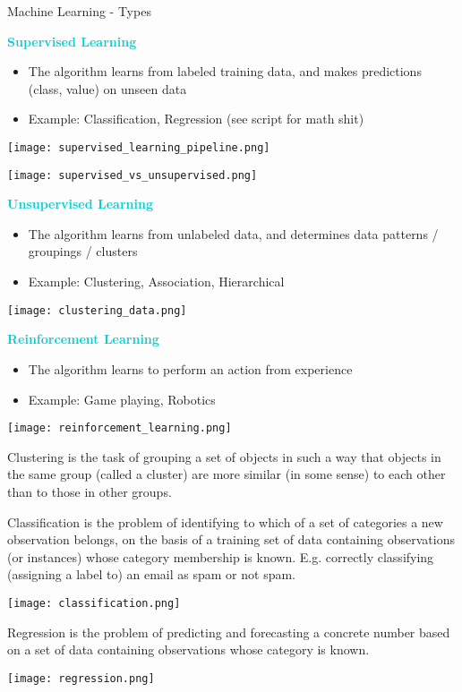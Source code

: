 \begin{concept}{Machine Learning - Types}

    \textcolor{darkturquoise}{\textbf{Supervised Learning}}
    \begin{itemize}
        \item The algorithm learns from labeled training data, and makes predictions (class, value) on unseen data
        \item Example: Classification, Regression (see script for math shit)
    \end{itemize}

    \texttt{[image: supervised\_learning\_pipeline.png]}

    \texttt{[image: supervised\_vs\_unsupervised.png]}

    \textcolor{darkturquoise}{\textbf{Unsupervised Learning}}
    \begin{itemize}
        \item The algorithm learns from unlabeled data, and determines data patterns / groupings / clusters
        \item Example: Clustering, Association, Hierarchical
    \end{itemize}

    \texttt{[image: clustering\_data.png]}

    \textcolor{darkturquoise}{\textbf{Reinforcement Learning}}
    \begin{itemize}
        \item The algorithm learns to perform an action from experience
        \item Example: Game playing, Robotics
    \end{itemize}

    \texttt{[image: reinforcement\_learning.png]}
\end{concept}

\begin{definition}{Clustering}
    is the task of grouping a set of objects in such a way that objects in the same group (called a cluster) are more similar (in some sense) to each other than to
    those in other groups.
\end{definition}

\begin{definition}{Classification}
    is the problem of identifying to which of a set of categories a new observation belongs, on the basis of a training set of data containing observations (or instances) whose category membership is known. 
    E.g. correctly classifying (assigning a label to) an email as spam or not spam.

    \texttt{[image: classification.png]}
\end{definition}

\begin{definition}{Regression}
    is the problem of predicting and forecasting a concrete number based on a set of data containing observations whose category is known.

    \texttt{[image: regression.png]}
\end{definition}



